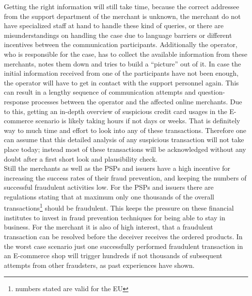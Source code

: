 Getting the right information will still take time, because the correct addressee from the support department of the merchant is unknown, the merchant do not have specialized staff at hand to handle these kind of queries, or there are misunderstandings on handling the case due to language barriers or different incentives between the communication participants. Additionally the operator, who is responsible for the case, has to collect the available information from these merchants, notes them down and tries to build a ``picture'' out of it. In case the initial information received from one of the participants have not been enough, the operator will have to get in contact with the support personnel again. This can result in a lengthy sequence of communication attempts and question-response processes between the operator and the affected online merchants. Due to this, getting an in-depth overview of suspicious credit card usages in the \gls{E-commerce} scenario is likely taking hours if not days or weeks. That is definitely way to much time and effort to look into any of these transactions. Therefore one can assume that this detailed analysis of any suspicious transaction will not take place today; instead most of these transactions will be acknowledged without any doubt after a first short look and plausibility check. \\

Still the merchants as well as the \gls{PSP}s and issuers have a high incentive for increasing the success rates of their fraud prevention, and keeping the numbers of successful fraudulent activities low. For the \gls{PSP}s and issuers there are regulations stating that at maximum only one thousands of the overall transactions\footnote{numbers stated are valid for the EU} should be fraudulent. This keeps the pressure on these financial institutes to invest in fraud prevention techniques for being able to stay in business. For the merchant it is also of high interest, that a fraudulent transaction can be resolved before the deceiver receives the ordered products. In the worst case scenario just one successfully performed fraudulent transaction in an \gls{E-commerce} shop will trigger hundreds if not thousands of subsequent attempts from other fraudsters, as past experiences have shown.


